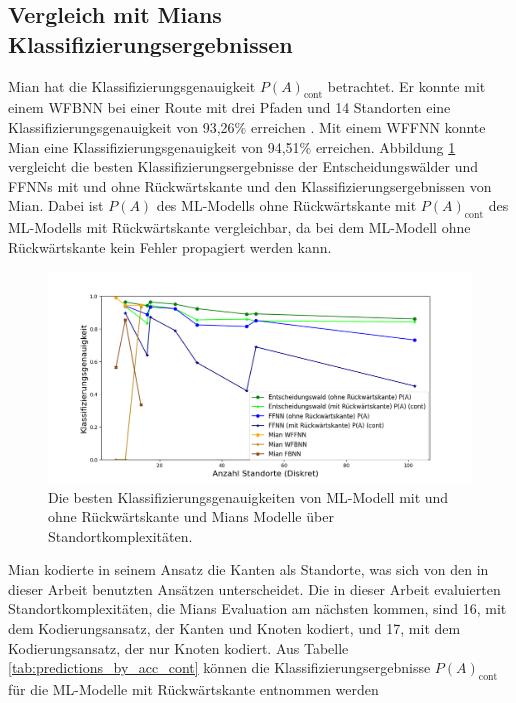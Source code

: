 \subsection{Vergleich mit Mians Klassifizierungsergebnissen}
Mian hat die Klassifizierungsgenauigkeit $P(A)_{\text{cont}}$ betrachtet.
Er konnte mit einem WFBNN bei einer Route mit drei Pfaden und 14 Standorten eine Klassifizierungsgenauigkeit von 93,26\% erreichen \cite{naveedThesis}.
Mit einem WFFNN konnte Mian eine Klassifizierungsgenauigkeit von 94,51\% erreichen.
Abbildung \ref{fig:best_dt_vs_knn_fb_vs_no_fb} vergleicht die besten Klassifizierungsergebnisse der Entscheidungswälder und FFNNs
mit und ohne Rückwärtskante und den Klassifizierungsergebnissen von Mian.
Dabei ist $P(A)$ des ML-Modells ohne Rückwärtskante mit $P(A)_{\text{cont}}$ des ML-Modells mit Rückwärtskante vergleichbar,
da bei dem ML-Modell ohne Rückwärtskante kein Fehler propagiert werden kann.
\begin{figure}[h!]
    \centering
    \includegraphics[width=\linewidth]{images/best_dt_vs_knn_fb_vs_no_fb.png}
    \caption{Die besten Klassifizierungsgenauigkeiten von ML-Modell mit und ohne Rückwärtskante und Mians Modelle über Standortkomplexitäten.}
    \label{fig:best_dt_vs_knn_fb_vs_no_fb}
\end{figure}
\newline
\newline
Mian kodierte in seinem Ansatz die Kanten als Standorte, was sich von den in dieser Arbeit benutzten Ansätzen unterscheidet.
Die in dieser Arbeit evaluierten Standortkomplexitäten, die Mians Evaluation am nächsten kommen, sind 16, mit dem Kodierungsansatz, der Kanten und Knoten kodiert,
und 17, mit dem Kodierungsansatz, der nur Knoten kodiert.
\newline
\newline
Aus Tabelle \ref{tab:predictions_by_acc_cont} können die Klassifizierungsergebnisse $P(A)_{\text{cont}}$ für die ML-Modelle mit Rückwärtskante entnommen werden

